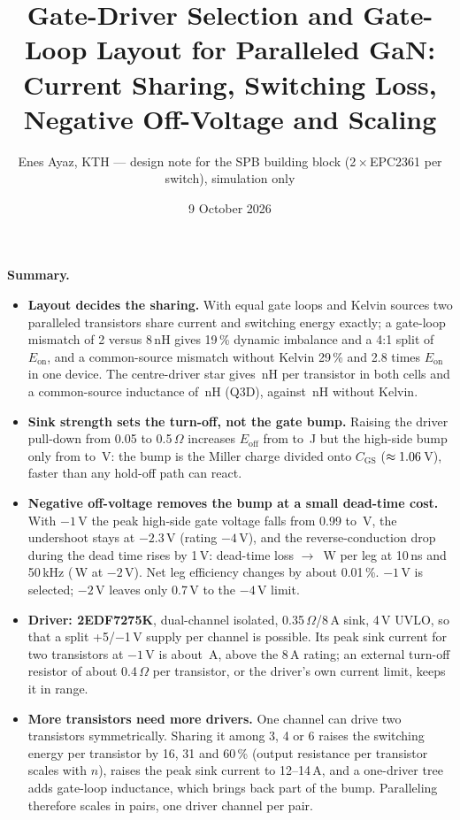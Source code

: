 \documentclass[10pt,a4paper]{article}
\title{\textbf{Gate-Driver Selection and Gate-Loop Layout for Paralleled GaN:\\Current Sharing, Switching Loss, Negative Off-Voltage and Scaling}}
\author{Enes Ayaz, KTH --- design note for the SPB building block (2\,$\times$\,EPC2361 per switch), simulation only}
\date{9 October 2026}
\begin{document}
\maketitle

\noindent\colorbox{box}{\parbox{\dimexpr\linewidth-2\fboxsep}{\small
\textbf{Summary.}
\begin{itemize}\itemsep1pt
\item \textbf{Layout decides the sharing.} With equal gate loops and Kelvin sources two paralleled transistors share current and switching energy exactly; a gate-loop mismatch of 2 versus 8\,nH gives 19\,\% dynamic imbalance and a 4:1 split of $E_\mathrm{on}$, and a common-source mismatch without Kelvin 29\,\% and 2.8 times $E_\mathrm{on}$ in one device. The centre-driver star gives \LgateCs\,nH per transistor in both cells and a common-source inductance of \LcsKel\,nH (Q3D), against \LcsNoK\,nH without Kelvin.
\item \textbf{Sink strength sets the turn-off, not the gate bump.} Raising the driver pull-down from 0.05 to 0.5\,$\Omega$ increases $E_\mathrm{off}$ from \RpdEoffLo{} to \RpdEoffHi\,\textmu J but the high-side bump only from \RpdBumpLo{} to \RpdBumpHi\,V: the bump is the Miller charge divided onto $C_\mathrm{GS}$ ($\approx1.06$\,V), faster than any hold-off path can react.
\item \textbf{Negative off-voltage removes the bump at a small dead-time cost.} With $-1$\,V the peak high-side gate voltage falls from 0.99 to \BmpNegOneSF\,V, the undershoot stays at $-2.3$\,V (rating $-4$\,V), and the reverse-conduction drop during the dead time rises by 1\,V: dead-time loss \DeadZero{} $\rightarrow$ \DeadOne\,W per leg at 10\,ns and 50\,kHz (\DeadTwo\,W at $-2$\,V). Net leg efficiency changes by about 0.01\,\%. $-1$\,V is selected; $-2$\,V leaves only 0.7\,V to the $-4$\,V limit.
\item \textbf{Driver: 2EDF7275K}, dual-channel isolated, 0.35\,$\Omega$/8\,A sink, 4\,V UVLO, so that a split +5/$-$1\,V supply per channel is possible. Its peak sink current for two transistors at $-1$\,V is about \SnkTwo\,A, above the 8\,A rating; an external turn-off resistor of about 0.4\,$\Omega$ per transistor, or the driver's own current limit, keeps it in range.
\item \textbf{More transistors need more drivers.} One channel can drive two transistors symmetrically. Sharing it among 3, 4 or 6 raises the switching energy per transistor by 16, 31 and 60\,\% (output resistance per transistor scales with $n$), raises the peak sink current to 12--14\,A, and a one-driver tree adds gate-loop inductance, which brings back part of the bump. Paralleling therefore scales in pairs, one driver channel per pair.
\end{itemize}}}
\end{document}

